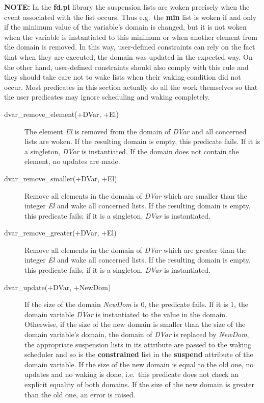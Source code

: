 {\bf NOTE:} In the {\bf fd.pl} library the suspension lists
are woken precisely when the event associated with the
list occurs.
Thus e.g.\ the {\bf min} list is woken if and only if the minimum
value of the variable's domain is changed, but it is not
woken when the variable is instantiated to this minimum
or when another element from the domain is removed.
In this way, user-defined constraints can rely on the fact that
when they are executed, the domain was updated in the expected way.
On the other hand, user-defined constraints should also comply
with this rule and they should take care not to wake lists
when their waking condition did not occur.
Most predicates in this section actually do all the work themselves
so that the user predicates may ignore scheduling and waking completely.

\begin{description}
\item[dvar_remove_element(+DVar, +El)]
The element {\it El} is removed from the domain of {\it DVar} and all
concerned lists are woken.
If the resulting domain is empty, this predicate fails. If it is
a singleton, {\it DVar} is instantiated.
If the domain does not contain the element,
no updates are made.

\item[dvar_remove_smaller(+DVar, +El)]
Remove all elements in the domain of {\it DVar} which are smaller than
the integer {\it El} and wake all concerned lists.
If the resulting domain is empty, this predicate fails; if it is
a singleton, {\it DVar} is instantiated.

\item[dvar_remove_greater(+DVar, +El)]
Remove all elements in the domain of {\it DVar} which are greater than
the integer {\it El} and wake all concerned lists.
If the resulting domain is empty, this predicate fails; if it is
a singleton, {\it DVar} is instantiated.

\item[dvar_update(+DVar, +NewDom)]
If the size of the domain {\it NewDom} is 0, the predicate fails.
If it is 1,
the domain variable {\it DVar}
is instantiated to the value in the domain.
Otherwise,
if the size of the new domain is smaller than the size of
the domain variable's domain,
the domain of {\it DVar} is replaced by {\it NewDom},
the appropriate suspension lists in its attribute are passed
to the waking scheduler and so is the {\bf constrained} list
in the {\bf suspend} attribute of the domain variable.
If the size of the new domain is equal to the old one, no
updates and no waking is done, i.e.\ this predicate does not
check an explicit equality of both domains.
If the size of the new domain is greater than the old one,
an error is raised.


\end{description}
